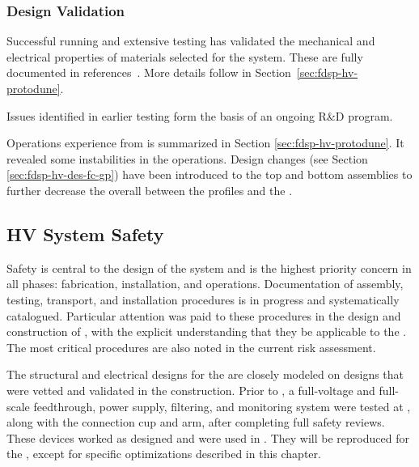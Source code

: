 \subsubsection{Design Validation}
\label{sec:fdsp-hv-des-des-val}

Successful  running and extensive testing has %
validated the mechanical and electrical properties of materials selected for the  system.  These are fully documented in references~\cite{bib:docdb2338, bib:docdb1504, bib:docdb1601}. More details follow in Section~\ref{sec:fdsp-hv-protodune}.


Issues identified in earlier testing form the basis of an ongoing R\&D program. 

Operations experience from  is summarized in Section \ref{sec:fdsp-hv-protodune}. It revealed some instabilities in the  operations.  Design changes (see Section \ref{sec:fdsp-hv-des-fc-gp}) have been introduced to the top and bottom  assemblies to further decrease the overall \efield between the profiles and the .


\subsection{HV System Safety}
\label{fdsp-hv-design-safety}

Safety is central to the design of the  system and is the highest priority concern in all phases: fabrication, installation, and operations. Documentation of assembly, testing, transport, and installation procedures is in progress and systematically catalogued. %
Particular attention was paid to these procedures in the design and construction of , with the explicit understanding that they be applicable to the . The most critical procedures are also noted in the current  risk assessment. 


The structural and electrical designs for the   are closely modeled on designs that were vetted and validated in the  construction. 
Prior to , a full-voltage and full-scale  feedthrough, power supply, filtering, and monitoring system were tested at , along with the  connection cup and arm,  %
after completing full safety reviews. 
These devices worked as designed and were used in . They will be reproduced for the ,  except for specific optimizations described in this chapter. %

